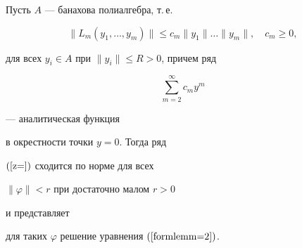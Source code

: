 \begin{lem}


\label{normlemma}


Пусть $A$ --- банахова полиалгебра, т.\,е.


\begin{equation}


\label{normalg}


\|L_m(y_1,\dotsc,y_m)\| \leq c_m\|y_1\|\dotsc\|y_m\|,\quad c_m\geq0,


\end{equation}


для всех $y_i\in A$ при $\|y_i\|\leq R>0$, причем ряд


\begin{equation}


\label{cmym}


\sum_{m=2}^{\infty}c_my^m


\end{equation}


--- аналитическая функция


в окрестности точки $ y=0 $. Тогда ряд


$(\ref{z=})$ сходится по норме для всех


$\|\varphi\|<r$ при достаточно малом $r>0$


и представляет


для таких $\varphi$ решение уравнения $(\ref{formlemm=2})$.


\end{lem}





